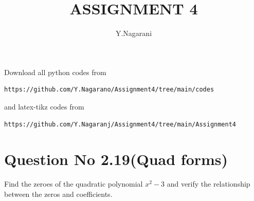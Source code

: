 \documentclass[journal,12pt,twocolumn]{IEEEtran}
\begin{document}
     \def\rightbox#1{\makebox[0in][r]{#1}}
     \def\centbox#1{\makebox[0in]{#1}}
     \def\topbox#1{\raisebox{-\baselineskip}[0in][0in]{#1}}
     \def\midbox#1{\raisebox{-0.5\baselineskip}[0in][0in]{#1}}
\vspace{3cm}
\title{ASSIGNMENT 4}
\author{Y.Nagarani}
\maketitle
\newpage
\bigskip
\renewcommand{\thefigure}{\theenumi}
\renewcommand{\thetable}{\theenumi}
Download all python codes from 
\begin{lstlisting}
https://github.com/Y.Nagarano/Assignment4/tree/main/codes
\end{lstlisting}
%
and latex-tikz codes from 
%
\begin{lstlisting}
https://github.com/Y.Nagaranj/Assignment4/tree/main/Assignment4
\end{lstlisting}
%
\section{Question No 2.19(Quad forms)}
Find the zeroes of the quadratic polynomial $x^2-3$ and verify the relationship between the zeros and coefficients.
%
\end{document}
